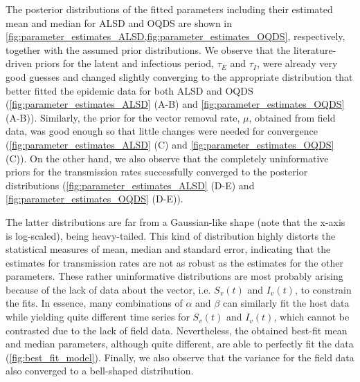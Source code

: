The posterior distributions of the fitted parameters including their
estimated mean and median for ALSD and OQDS are shown in
\cref{fig:parameter_estimates_ALSD,fig:parameter_estimates_OQDS}, respectively,
together with the assumed prior distributions. We observe that the
literature-driven priors for the latent and infectious period, $\tau_E$ and
$\tau_I$, were already very good guesses and changed slightly converging to the
appropriate distribution that better fitted the epidemic data for both ALSD and
OQDS (\cref{fig:parameter_estimates_ALSD} (A-B) and
\cref{fig:parameter_estimates_OQDS} (A-B)). Similarly, the prior for the vector
removal rate, $\mu$, obtained from field data, was good enough so that little
changes were needed for convergence (\cref{fig:parameter_estimates_ALSD} (C)
and
\cref{fig:parameter_estimates_OQDS} (C)). On the other hand, we also observe
that the completely uninformative priors for the transmission rates
successfully converged to the posterior distributions
(\cref{fig:parameter_estimates_ALSD} (D-E) and
\cref{fig:parameter_estimates_OQDS} (D-E)).

The latter distributions are far from a Gaussian-like shape (note that the
x-axis is log-scaled), being heavy-tailed. This kind of distribution highly
distorts the statistical measures of mean, median and standard error,
indicating that the estimates for transmission rates are not as robust as the
estimates for the other parameters. These rather uninformative distributions
are most probably arising because of the lack of data about the vector, i.e.
$S_v(t)$ and $I_v(t)$, to constrain the fits. In essence, many combinations of
$\alpha$ and $\beta$ can similarly fit the host data while yielding quite
different time series for $S_v(t)$ and $I_v(t)$, which cannot be contrasted due
to the lack of field data. Nevertheless, the obtained best-fit mean and median
parameters, although quite different, are able to perfectly fit the data
(\cref{fig:best_fit_model}). Finally, we also observe that the variance for the
field data also converged to a bell-shaped distribution.


